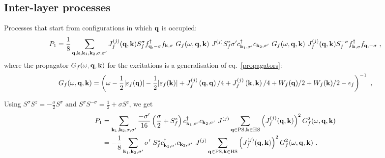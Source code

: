\documentclass[%
reprint,
superscriptaddress,
groupedaddress,
superscriptaddress,
onecolumn,
]{revtex4-2}
\begin{document}
\subsection{Inter-layer processes}
Processes that start from configurations in which \({\bf q}\) is occupied:
\begin{equation}\begin{aligned}
	P_1 = \frac{1}{8}\sum_{{\bf q},{\bf k},{\bf k}_1, {\bf k}_2,\sigma,\sigma^\prime} J_f^{(j)}({\bf q},{\bf k}) S_f^\sigma f^\dagger_{{\bf q},-\sigma}f_{{\bf k},\sigma} ~ G_f(\omega, {\bf q}, {\bf k}) ~ J^{(j)} S_f^z \sigma^\prime c^\dagger_{{\bf k}_1,\sigma^\prime}c_{{\bf k}_2,\sigma^\prime} ~ G_f(\omega, {\bf q}, {\bf k}) ~ J_f^{(j)}({\bf q},{\bf k}) S_f^{-\sigma} f^\dagger_{{\bf k},\sigma}f_{{\bf q},-\sigma}~,
\end{aligned}\end{equation}
where the propagator \(G_f(\omega, {\bf q}, {\bf k})\) for the excitations is a generalisation of eq.~\ref{propagators}:
\begin{equation}\begin{aligned}
	G_f(\omega, {\bf q}, {\bf k}) &= \left(\omega - \frac{1}{2}|\varepsilon_f({\bf q})| - \frac{1}{2}|\varepsilon_f({\bf k})| + J^{(j)}_f\left({\bf q},{\bf q}\right)/4 + J^{(j)}_f\left({\bf k},{\bf k}\right)/4 + W_f({\bf q})/2 + W_f({\bf k})/2 - \epsilon_f\right)^{-1} ~,\\
\end{aligned}\end{equation}

Using \(S^\sigma S^z = -\frac{\sigma}{2}S^\sigma\) and \(S^\sigma S^{-\sigma} = \frac{1}{2} + \sigma S^z\), we get
\begin{equation}\begin{aligned}
	P_1 &= \sum_{{\bf k}_1, {\bf k}_2,\sigma,\sigma^\prime} \frac{-\sigma^\prime}{16} \left(\frac{\sigma}{2} + S_f^z\right) c^\dagger_{{\bf k}_1,\sigma^\prime}c_{{\bf k}_2,\sigma^\prime} ~  J^{(j)} \sum_{{\bf q} \in \text{PS} ,{\bf k} \in \text{HS}}\left(J_f^{(j)}({\bf q},{\bf k})\right)^2 G^2_f(\omega, {\bf q}, {\bf k})\\
		&= -\frac{1}{8}\sum_{{\bf k}_1, {\bf k}_2,\sigma^\prime} \sigma^\prime~S_f^z c^\dagger_{{\bf k}_1,\sigma^\prime}c_{{\bf k}_2,\sigma^\prime} ~  J^{(j)} \sum_{{\bf q} \in \text{PS} ,{\bf k} \in \text{HS}}\left(J_f^{(j)}({\bf q},{\bf k})\right)^2 G^2_f(\omega, {\bf q}, {\bf k})~.
\end{aligned}\end{equation}
\end{document}
